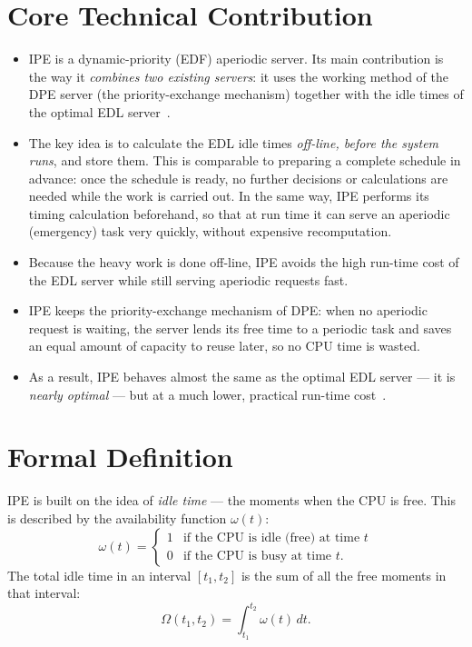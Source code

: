 \documentclass[conference]{IEEEtran}
\begin{document}
\section{Core Technical Contribution}

\begin{itemize}
  \item IPE is a dynamic-priority (EDF) aperiodic server. Its main
        contribution is the way it \emph{combines two existing servers}: it
        uses the working method of the DPE server (the priority-exchange
        mechanism) together with the idle times of the optimal EDL
        server~\cite{spuri1996}.
  \item The key idea is to calculate the EDL idle times \emph{off-line, before
        the system runs}, and store them. This is comparable to preparing a
        complete schedule in advance: once the schedule is ready, no further
        decisions or calculations are needed while the work is carried out. In
        the same way, IPE performs its timing calculation beforehand, so that
        at run time it can serve an aperiodic (emergency) task very quickly,
        without expensive recomputation.
  \item Because the heavy work is done off-line, IPE avoids the high run-time
        cost of the EDL server while still serving aperiodic requests fast.
  \item IPE keeps the priority-exchange mechanism of DPE: when no aperiodic
        request is waiting, the server lends its free time to a periodic task
        and saves an equal amount of capacity to reuse later, so no CPU time
        is wasted.
  \item As a result, IPE behaves almost the same as the optimal EDL server ---
        it is \emph{nearly optimal} --- but at a much lower, practical
        run-time cost~\cite{buttazzo}.
\end{itemize}

\section{Formal Definition}

IPE is built on the idea of \emph{idle time} --- the moments when the CPU is
free. This is described by the availability function $\omega(t)$:
\begin{equation}
  \omega(t) =
  \begin{cases}
    1 & \text{if the CPU is idle (free) at time } t \\
    0 & \text{if the CPU is busy at time } t .
  \end{cases}
\end{equation}
The total idle time in an interval $[t_1,t_2]$ is the sum of all the free
moments in that interval:
\begin{equation}
  \Omega(t_1,t_2) = \int_{t_1}^{t_2} \omega(t)\, dt .
\end{equation}
\end{document}
